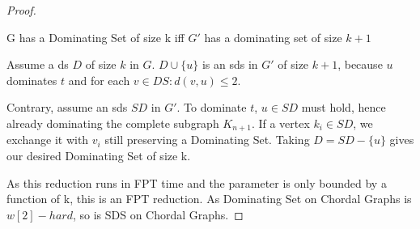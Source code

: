 \begin{proof}
    \begin{corollary}
    G has a Dominating Set of size k iff $G'$ has a dominating set of size $k+1$
    \end{corollary}
    \begin{subproof}
    Assume a ds $D$ of size $k$ in $G$. $D \cup \{u\}$ is an sds in $G'$ of size $k + 1$, because $u$ dominates $t$ and for each $v \in DS: d(v, u) \leq 2$.

    Contrary, assume an sds $SD$ in $G'$. To dominate $t$, $u \in SD$ must hold, hence already dominating the complete subgraph $K_{n+1}$. If a vertex $k_i \in SD$, we exchange it with $v_i$ still preserving a Dominating Set. Taking $D = SD - \{ u \}$ gives our desired Dominating Set of size k.
    \end{subproof}
    As this reduction runs in FPT time and the parameter is only bounded by a function of k, this is an FPT reduction. As Dominating Set on Chordal Graphs is $w[2]-hard$, so is SDS on Chordal Graphs.

\end{proof}
